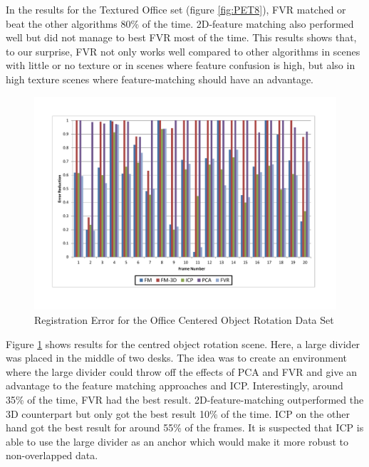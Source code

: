 In the results for the Textured Office set (figure \ref{fig:PET8}), FVR matched or beat the other algorithms 80\% of the time. 2D-feature matching also performed well but did not manage to best FVR most of the time. This results shows that, to our surprise, FVR not only works well compared to other algorithms in scenes with little or no texture or in scenes where feature confusion is high, but also in high texture scenes where feature-matching should have an advantage.


\begin{figure}[t]
\centering
\includegraphics[width=6.0in]{images/results/Office_Texture_blind_spot_rotation}
\caption{Registration Error for the Office Centered Object Rotation Data Set}
\label{fig:PET9}
\end{figure}

Figure \ref{fig:PET9} shows results for the centred object rotation scene. Here, a large divider was placed in the middle of two desks. The idea was to create an environment where the large divider could throw off the effects of PCA and FVR and give an advantage to the feature matching approaches and ICP. Interestingly, around 35\% of the time, FVR had the best result. 2D-feature-matching outperformed the 3D counterpart but only got the best result 10\% of the time. ICP on the other hand got the best result for around 55\% of the frames. It is suspected that ICP is able to use the large divider as an anchor which would make it more robust to non-overlapped data.

